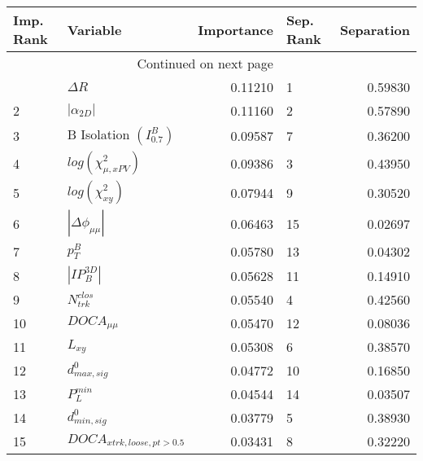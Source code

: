 

\begin{longtable}{llrlr}
\toprule
Imp. Rank &                     Variable &  Importance & Sep. Rank &  Separation \\
\midrule
\endhead
\midrule
\multicolumn{3}{r}{{Continued on next page}} \\
\midrule
\endfoot

\bottomrule
\endlastfoot
        1 &                   $\Delta R$ &     0.11210 &         1 &     0.59830 \\
        2 &              $|\alpha_{2D}|$ &     0.11160 &         2 &     0.57890 \\
        3 &  B Isolation $(I^{B}_{0.7})$ &     0.09587 &         7 &     0.36200 \\
        4 &    $log(\chi^{2}_{\mu,xPV})$ &     0.09386 &         3 &     0.43950 \\
        5 &         $log(\chi^{2}_{xy})$ &     0.07944 &         9 &     0.30520 \\
        6 &     $|\Delta \phi_{\mu\mu}|$ &     0.06463 &        15 &     0.02697 \\
        7 &                    $p^B_{T}$ &     0.05780 &        13 &     0.04302 \\
        8 &              $|IP_{B}^{3D}|$ &     0.05628 &        11 &     0.14910 \\
        9 &             $N^{clos}_{trk}$ &     0.05540 &         4 &     0.42560 \\
       10 &              $DOCA_{\mu\mu}$ &     0.05470 &        12 &     0.08036 \\
       11 &                     $L_{xy}$ &     0.05308 &         6 &     0.38570 \\
       12 &             $d^0_{max, sig}$ &     0.04772 &        10 &     0.16850 \\
       13 &                $P^{min}_{L}$ &     0.04544 &        14 &     0.03507 \\
       14 &             $d^0_{min, sig}$ &     0.03779 &         5 &     0.38930 \\
       15 &   $DOCA_{xtrk,loose,pt>0.5}$ &     0.03431 &         8 &     0.32220 \\
\end{longtable}

